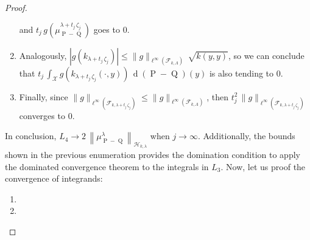 \begin{proof}
\begin{enumerate}
\begin{equation}
				\end{equation}
				and $t_{j}\,g\left(\mu_{\operatorname{P}-\operatorname{Q}}^{\lambda+t_{j}\,\zeta_{j}}\right)$ goes to $0$.
				\item Analogously, $\left|g\left(k_{\lambda+t_{j}\,\zeta_{j}}\right)\right|\leq\|g\|_{\ell^{\infty}\left(\mathcal{F}_{k,\Lambda}\right)}\,\sqrt{k(y,y)}$, so we can conclude that $t_{j}\,\int_{\mathcal{X}}g\left(k_{\lambda+t_{j}\,\zeta_{j}}(\cdot,y)\right)\,\operatorname{d}(\operatorname{P}-\operatorname{Q})(y)$ is also tending to $0$.
				\item Finally, since $\|g\|_{\ell^{\infty}\left(\mathcal{F}_{k,\lambda+t_{j}\,\zeta_{j}}\right)}\leq\|g\|_{\ell^{\infty}\left(\mathcal{F}_{k,\Lambda}\right)}$, then $t_{j}^{2}\,\|g\|_{\ell^{\infty}\left(\mathcal{F}_{k,\lambda+t_{j}\,\zeta_{j}}\right)}$ converges to $0$.
			\end{enumerate}
			In conclusion, $L_{4}\longrightarrow2\,\left\|\mu_{\operatorname{P}-\operatorname{Q}}^{\lambda}\right\|_{\mathcal{H}_{k,\lambda}}$ when $j\longrightarrow\infty$. Additionally, the bounds shown in the previous enumeration provides the domination condition to apply the dominated convergence theorem to the integrals in $L_{3}$. Now, let us proof the convergence of integrands:
			\begin{enumerate}
				\item
				\item
			\end{enumerate}
		\end{proof}
